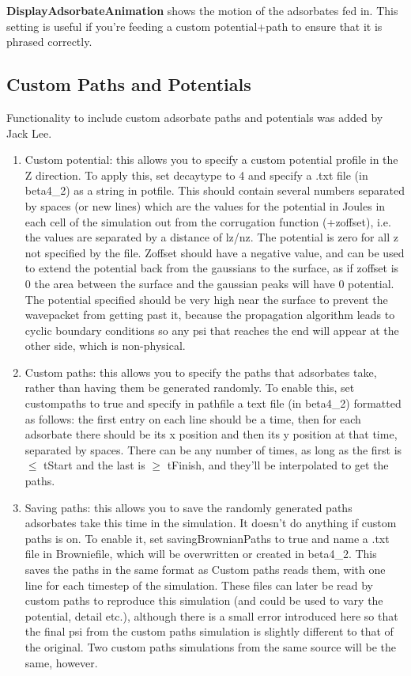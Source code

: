 \documentclass[11pt,letterpaper]{article}
\begin{document}
\textbf{DisplayAdsorbateAnimation} shows the motion of the adsorbates fed in. This setting is useful if you're feeding a custom potential+path to ensure that it is phrased correctly.\\






\subsection{Custom Paths and Potentials}
Functionality to include custom adsorbate paths and potentials was added by Jack Lee.

\begin{enumerate}
    \item Custom potential: this allows you to specify a custom potential profile in the Z direction. To apply this, set decaytype to 4 and specify a .txt file (in beta4\_2) as a string in potfile. This should contain several numbers separated by spaces (or new lines) which are the values for the potential in Joules in each cell of the simulation out from the corrugation function (+zoffset), i.e. the values are separated by a distance of lz/nz. The potential is zero for all z not specified by the file. Zoffset should have a negative value, and can be used to extend the potential back from the gaussians to the surface, as if zoffset is 0 the area between the surface and the gaussian peaks will have 0 potential. The potential specified should be very high near the surface to prevent the wavepacket from getting past it, because the propagation algorithm leads to cyclic boundary conditions so any psi that reaches the end will appear at the other side, which is non-physical.
    \item Custom paths: this allows you to specify the paths that adsorbates take, rather than having them be generated randomly. To enable this, set custompaths to true and specify in pathfile a text file (in beta4\_2) formatted as follows: the first entry on each line should be a time, then for each adsorbate there should be its x position and then its y position at that time, separated by spaces. There can be any number of times, as long as the first is $\leq$ tStart and the last is $\geq$ tFinish, and they’ll be interpolated to get the paths. 
    \item Saving paths: this allows you to save the randomly generated paths adsorbates take this time in the simulation. It doesn’t do anything if custom paths is on. To enable it, set savingBrownianPaths to true and name a .txt file in Browniefile, which will be overwritten or created in beta4\_2. This saves the paths in the same format as Custom paths reads them, with one line for each timestep of the simulation. These files can later be read by custom paths to reproduce this simulation (and could be used to vary the potential, detail etc.), although there is a small error introduced here so that the final psi from the custom paths simulation is slightly different to that of the original. Two custom paths simulations from the same source will be the same, however.
\end{enumerate}
\end{document}
